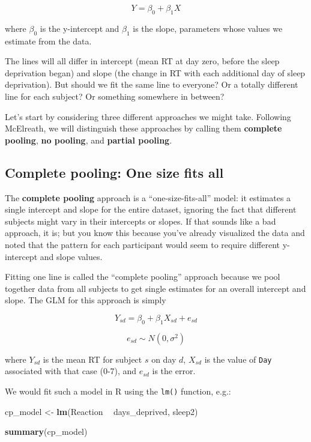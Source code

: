 \documentclass[]{book}
\newenvironment{Shaded}{\begin{snugshade}}{\end{snugshade}}
\newcommand{\KeywordTok}[1]{\textcolor[rgb]{0.13,0.29,0.53}{\textbf{#1}}}
\newcommand{\NormalTok}[1]{#1}
\newcommand{\OperatorTok}[1]{\textcolor[rgb]{0.81,0.36,0.00}{\textbf{#1}}}
\newcommand{\StringTok}[1]{\textcolor[rgb]{0.31,0.60,0.02}{#1}}
\begin{document}
\[Y = \beta_0 + \beta_1 X\]

where \(\beta_0\) is the y-intercept and \(\beta_1\) is the slope, parameters whose values we estimate from the data.

The lines will all differ in intercept (mean RT at day zero, before the sleep deprivation began) and slope (the change in RT with each additional day of sleep deprivation). But should we fit the same line to everyone? Or a totally different line for each subject? Or something somewhere in between?

Let's start by considering three different approaches we might take. Following McElreath, we will distinguish these approaches by calling them \textbf{complete pooling}, \textbf{no pooling}, and \textbf{partial pooling}.

\hypertarget{complete-pooling-one-size-fits-all}{%
\subsection{Complete pooling: One size fits all}\label{complete-pooling-one-size-fits-all}}

The \textbf{complete pooling} approach is a ``one-size-fits-all'' model: it estimates a single intercept and slope for the entire dataset, ignoring the fact that different subjects might vary in their intercepts or slopes. If that sounds like a bad approach, it is; but you know this because you've already visualized the data and noted that the pattern for each participant would seem to require different y-intercept and slope values.

Fitting one line is called the ``complete pooling'' approach because we pool together data from all subjects to get single estimates for an overall intercept and slope. The GLM for this approach is simply

\[Y_{sd} = \beta_0 + \beta_1 X_{sd} + e_{sd}\]

\[e_{sd} \sim N\left(0, \sigma^2\right)\]

where \(Y_{sd}\) is the mean RT for subject \(s\) on day \(d\), \(X_{sd}\) is the value of \texttt{Day} associated with that case (0-7), and \(e_{sd}\) is the error.

We would fit such a model in R using the \texttt{lm()} function, e.g.:

\begin{Shaded}
\begin{Highlighting}[]
\NormalTok{cp_model <-}\StringTok{ }\KeywordTok{lm}\NormalTok{(Reaction }\OperatorTok{~}\StringTok{ }\NormalTok{days_deprived, sleep2)}

\KeywordTok{summary}\NormalTok{(cp_model)}
\end{Highlighting}
\end{Shaded}
\end{document}
